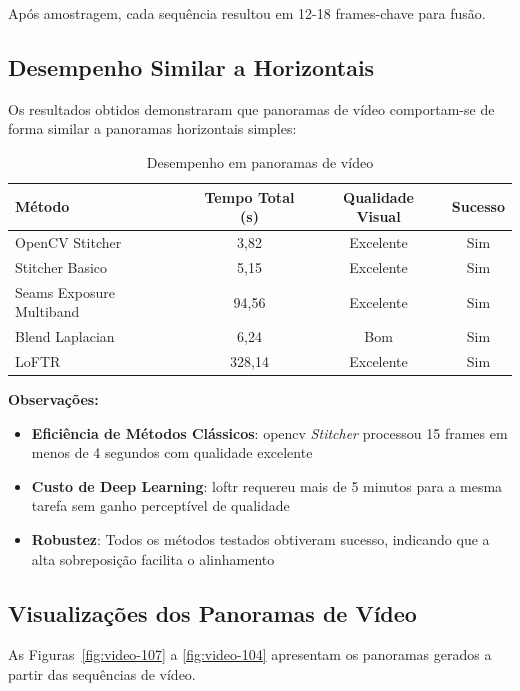 Após amostragem, cada sequência resultou em 12-18 frames-chave para fusão.

\subsection{Desempenho Similar a Horizontais}

Os resultados obtidos demonstraram que panoramas de vídeo comportam-se de forma similar a panoramas horizontais simples:

\begin{table}[htb]
\centering
\caption{Desempenho em panoramas de vídeo}
\label{tab:video-performance}
\small
\begin{tabular}{lccc}
\hline
\textbf{Método} & \textbf{Tempo Total (s)} & \textbf{Qualidade Visual} & \textbf{Sucesso} \\ \hline
OpenCV Stitcher & 3,82 & Excelente & Sim \\
Stitcher Basico & 5,15 & Excelente & Sim \\
Seams Exposure Multiband & 94,56 & Excelente & Sim \\
Blend Laplacian & 6,24 & Bom & Sim \\
LoFTR & 328,14 & Excelente & Sim \\
\hline
\end{tabular}
\end{table}

\textbf{Observações:}

\begin{itemize}
    \item \textbf{Eficiência de Métodos Clássicos}: \gls{opencv} \textit{Stitcher} processou 15 frames em menos de 4 segundos com qualidade excelente
    \item \textbf{Custo de Deep Learning}: \gls{loftr} requereu mais de 5 minutos para a mesma tarefa sem ganho perceptível de qualidade
    \item \textbf{Robustez}: Todos os métodos testados obtiveram sucesso, indicando que a alta sobreposição facilita o alinhamento
\end{itemize}

\subsection{Visualizações dos Panoramas de Vídeo}

As Figuras~\ref{fig:video-107} a \ref{fig:video-104} apresentam os panoramas gerados a partir das sequências de vídeo.

